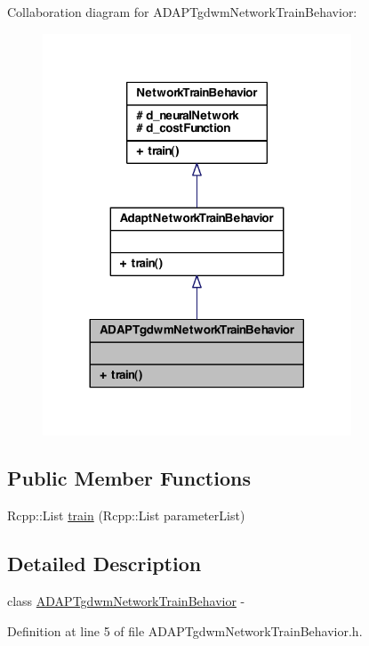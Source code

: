 Collaboration diagram for ADAPTgdwmNetworkTrainBehavior:
\nopagebreak
\begin{figure}[H]
\begin{center}
\leavevmode
\includegraphics[width=260pt]{class_a_d_a_p_tgdwm_network_train_behavior__coll__graph}
\end{center}
\end{figure}
\subsection*{Public Member Functions}
\begin{DoxyCompactItemize}
\item 
Rcpp::List \hyperlink{class_a_d_a_p_tgdwm_network_train_behavior_a64d92d49b38b3105bc46ea49dff6518e}{train} (Rcpp::List parameterList)
\end{DoxyCompactItemize}


\subsection{Detailed Description}
class \hyperlink{class_a_d_a_p_tgdwm_network_train_behavior}{ADAPTgdwmNetworkTrainBehavior} -\/ 

Definition at line 5 of file ADAPTgdwmNetworkTrainBehavior.h.



